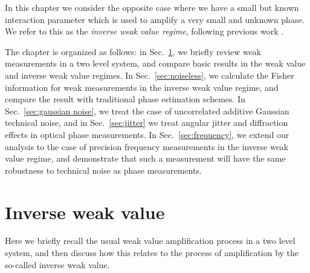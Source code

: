 In this chapter we consider the opposite case where we have a small but known interaction parameter which is used to amplify a very small and unknown phase.  We refer to this as the \emph{inverse weak value regime}, following previous work \cite{Starling2010a,Dressel2013,Lyons2015,Kofman2012}. 

The chapter is organized as follows: in Sec.~\ref{sec:inverse weak values}, we briefly review weak measurements in a two level system, and compare basic results in the weak value and inverse weak value regimes.  In Sec.~\ref{sec:noiseless}, we calculate the Fisher information for weak measurements in the inverse weak value regime, and compare the result with traditional phase estimation schemes. In Sec.~\ref{sec:gaussian noise}, we treat the case of uncorrelated additive Gaussian technical noise, and in Sec.~\ref{sec:jitter} we treat angular jitter and diffraction effects in optical phase measurements.  In Sec.~\ref{sec:frequency}, we extend our analysis to the case of precision frequency measurements in the inverse weak value regime, and demonstrate that such a measurement will have the same robustness to technical noise as phase measurements.

\section{Inverse weak value}\label{sec:inverse weak values}
Here we briefly recall the usual weak value amplification process in a two level system, and then discuss how this relates to the process of amplification by the so-called inverse weak value.  


